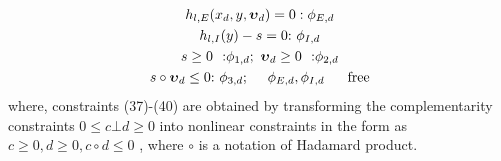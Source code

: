\documentclass[journal]{IEEEtran}
\begin{document}
\begin{gather}
{h_{l,E}}({x_d},y,{\boldsymbol{\upsilon }_d}) = 0{\rm{    }}:{\phi _{E,d}}\\
{h_{l,I}}(y) - s = 0{\rm{    :}}~{\phi _{I,d}}\\
s \ge 0~~{\rm{    :}}{\phi _{1,d}};~{\boldsymbol{\upsilon} _d} \ge 0~~{\rm{     :}}{\phi _{2,d}}\\
s \circ {\boldsymbol{\upsilon} _d} \le 0{\rm{    :}}~{\phi _{3,d}};~~~~ {\phi _{E,d}},{\phi _{I,d}}~~~~~{\rm{    free}}
\end{gather}
where, constraints (37)-(40) are obtained by transforming the complementarity constraints $0 \le c \bot d \ge 0$ into nonlinear constraints in the form as $c \ge 0,d \ge 0,c \circ d \le 0$ , where $ \circ $  is a notation of Hadamard product.

\vspace{-2mm}
\end{document}
